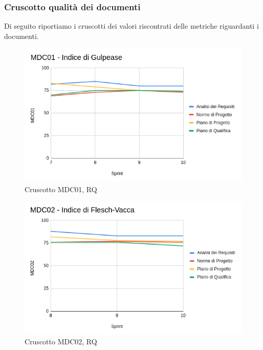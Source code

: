 \subsubsection{Cruscotto qualità dei documenti}
Di seguito riportiamo i cruscotti dei valori riscontrati delle metriche riguardanti i documenti.
\begin{figure}[H]
    \centering
    \includegraphics[scale = 0.63]{immagini/cruscottoRQ.png}
    \caption{Cruscotto MDC01, RQ}
\end{figure}

\begin{figure}[H]
    \centering
    \includegraphics[scale = 0.63]{immagini/cruscottoFleshRQ.png}
    \caption{Cruscotto MDC02, RQ}
\end{figure}


